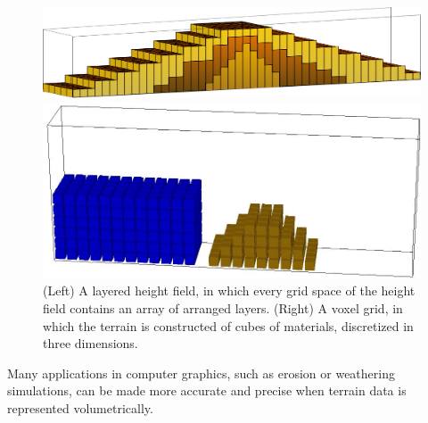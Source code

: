 \begin{figure}[t]
    \centering
    \begin{minipage}{0.49\textwidth}
      \includegraphics[width=1.0\textwidth, height=0.15\textheight]{images/SHF.pdf} 	 
    \end{minipage}
% 
   \begin{minipage}{0.49\textwidth}
    \includegraphics[width=1.0\textwidth]{images/VoxelGrid.jpg}
   \end{minipage}
	\caption[A rendering of volumetric terrain data structures]{(Left) 
A layered height field, in which every grid space of the height field contains an array of arranged layers.
(Right) A voxel grid, in which the terrain is constructed of cubes of materials, discretized in three dimensions.}
	\label{figure:data_structures}
\end{figure}

Many applications in computer graphics, such as erosion or weathering simulations, can be made more accurate and precise when terrain data is represented volumetrically. 

